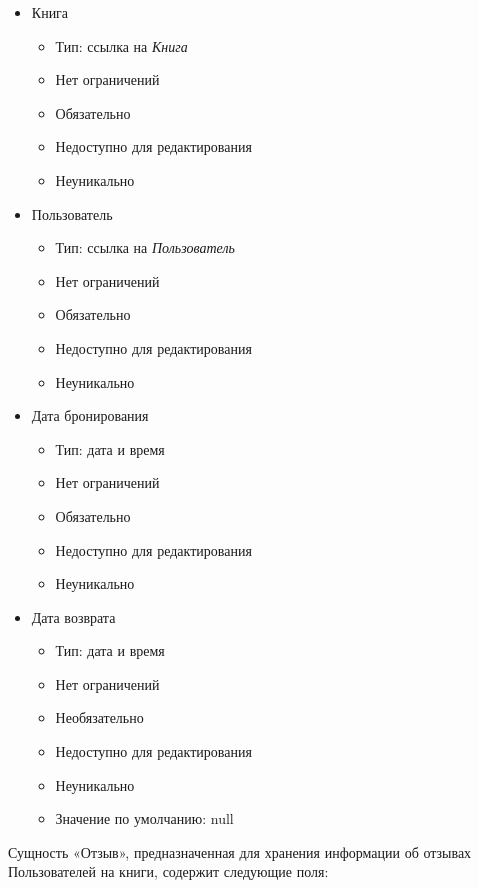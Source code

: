 \documentclass[data-specification.tex]{subfiles}
\begin{document}
\begin{itemize}
    \item Книга
    \begin{itemize}
        \item Тип: ссылка на \textsl{Книга}
        \item Нет ограничений
        \item Обязательно
        \item Недоступно для редактирования
        \item Неуникально
    \end{itemize}
    \item Пользователь
    \begin{itemize}
        \item Тип: ссылка на \textsl{Пользователь}
        \item Нет ограничений
        \item Обязательно
        \item Недоступно для редактирования
        \item Неуникально
    \end{itemize}
    \item Дата бронирования
    \begin{itemize}
        \item Тип: дата и время
        \item Нет ограничений
        \item Обязательно
        \item Недоступно для редактирования
        \item Неуникально
    \end{itemize}
    \item Дата возврата
    \begin{itemize}
        \item Тип: дата и время
        \item Нет ограничений
        \item Необязательно
        \item Недоступно для редактирования
        \item Неуникально
        \item Значение по умолчанию: null
    \end{itemize}
\end{itemize}
\par
Сущность «Отзыв», предназначенная для хранения информации об отзывах Пользователей на книги, содержит следующие поля:
\end{document}
